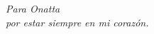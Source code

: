 \thispagestyle{empty}
\vspace*{8cm}
\begin{flushright}
\textit{Para Onatta\\
por estar siempre en mi corazón.}
\end{flushright}                 

